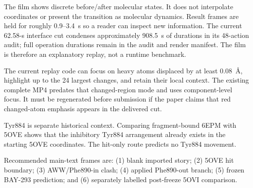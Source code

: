 The film shows discrete before/after molecular states. It does not interpolate
coordinates or present the transition as molecular dynamics. Result frames are
held for roughly 0.9--3.4~s so a reader can inspect new information. The current
62.58-s interface cut condenses approximately 908.5~s of durations in its
48-action audit; full operation durations remain in the audit and render
manifest. The film is therefore an explanatory replay, not a runtime benchmark.

The current replay code can focus on heavy atoms displaced by at least
0.08~\AA{}, highlight up to the 24 largest changes, and retain their local
context. The existing complete MP4 predates that changed-region mode and uses
component-level focus. It must be regenerated before submission if the paper
claims that red changed-atom emphasis appears in the delivered cut.

Tyr884 is separate historical context. Comparing fragment-bound 6EPM with 5OVE
shows that the inhibitory Tyr884 arrangement already exists in the starting
5OVE coordinates. The hit-only route predicts no Tyr884 movement.

Recommended main-text frames are: (1) blank imported story; (2) 5OVE hit
boundary; (3) AWW/Phe890-in clash; (4) applied Phe890-out branch; (5) frozen
BAY-293 prediction; and (6) separately labelled post-freeze 5OVI comparison.
